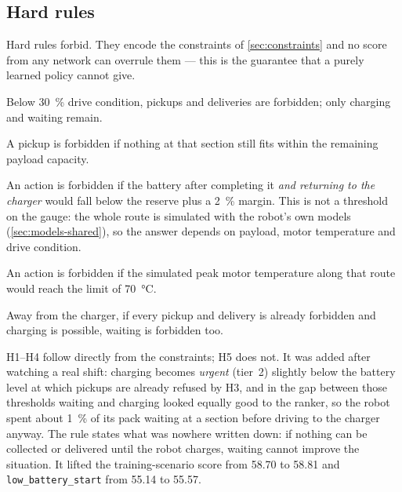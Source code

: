 \subsection{Hard rules}
\label{sec:hard-rules}

Hard rules forbid. They encode the constraints of \cref{sec:constraints} and no score from any
network can overrule them --- this is the guarantee that a purely learned policy cannot give.

\begin{description}[leftmargin=1.2em, style=nextline, itemsep=0.2em]
  \item[H1 --- Maintenance.] Below \SI{30}{\percent} drive condition, pickups and deliveries are
        forbidden; only charging and waiting remain.
  \item[H2 --- Payload.] A pickup is forbidden if nothing at that section still fits within the
        remaining payload capacity.
  \item[H3 --- Reserve.] An action is forbidden if the battery after completing it \emph{and
        returning to the charger} would fall below the reserve plus a \SI{2}{\percent} margin. This
        is not a threshold on the gauge: the whole route is simulated with the robot's own models
        (\cref{sec:models-shared}), so the answer depends on payload, motor temperature and drive
        condition.
  \item[H4 --- Heat.] An action is forbidden if the simulated peak motor temperature along that
        route would reach the limit of \SI{70}{\degreeCelsius}.
  \item[H5 --- Pointless waiting.] Away from the charger, if every pickup and delivery is already
        forbidden and charging is possible, waiting is forbidden too.
\end{description}

H1--H4 follow directly from the constraints; H5 does not. It was added after watching a real shift:
charging becomes \emph{urgent} (tier~2) slightly below the battery level at which pickups are
already refused by H3, and in the gap between those thresholds waiting and charging looked equally
good to the ranker, so the robot spent about \SI{1}{\percent} of its pack waiting at a section
before driving to the charger anyway. The rule states what was nowhere written down: if nothing can
be collected or delivered until the robot charges, waiting cannot improve the situation. It lifted
the training-scenario score from \num{58.70} to \num{58.81} and
\texttt{low\_battery\_start} from \num{55.14} to \num{55.57}.

